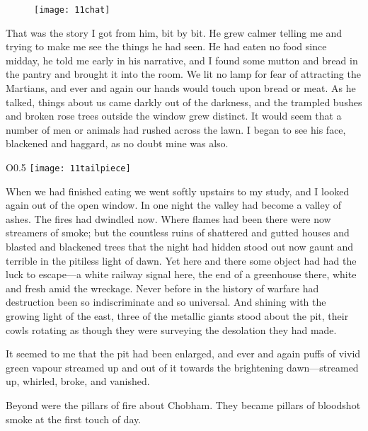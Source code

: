 \begin{figure}[tb]
\centering
\texttt{[image: 11chat]}
\end{figure}

That was the story I got from him, bit by bit. He grew calmer telling me and trying to make me see the things he had seen. He had eaten no food since midday, he told me early in his narrative, and I found some mutton and bread in the pantry and brought it into the room. We lit no lamp for fear of attracting the Martians, and ever and again our hands would touch upon bread or meat. As he talked, things about us came darkly out of the darkness, and the trampled bushes and broken rose trees outside the window grew distinct. It would seem that a number of men or animals had rushed across the lawn. I began to see his face, blackened and haggard, as no doubt mine was also.

\begin{wrapfigure}{O}{0.5\textwidth}
\centering
\texttt{[image: 11tailpiece]}
\end{wrapfigure}

When we had finished eating we went softly upstairs to my study, and I looked again out of the open window. In one night the valley had become a valley of ashes. The fires had dwindled now. Where flames had been there were now streamers of smoke; but the countless ruins of shattered and gutted houses and blasted and blackened trees that the night had hidden stood out now gaunt and terrible in the pitiless light of dawn. Yet here and there some object had had the luck to escape—a white railway signal here, the end of a greenhouse there, white and fresh amid the wreckage. Never before in the history of warfare had destruction been so indiscriminate and so universal. And shining with the growing light of the east, three of the metallic giants stood about the pit, their cowls rotating as though they were surveying the desolation they had made.

It seemed to me that the pit had been enlarged, and ever and again puffs of vivid green vapour streamed up and out of it towards the brightening dawn—streamed up, whirled, broke, and vanished.

Beyond were the pillars of fire about Chobham. They became pillars of bloodshot smoke at the first touch of day.

